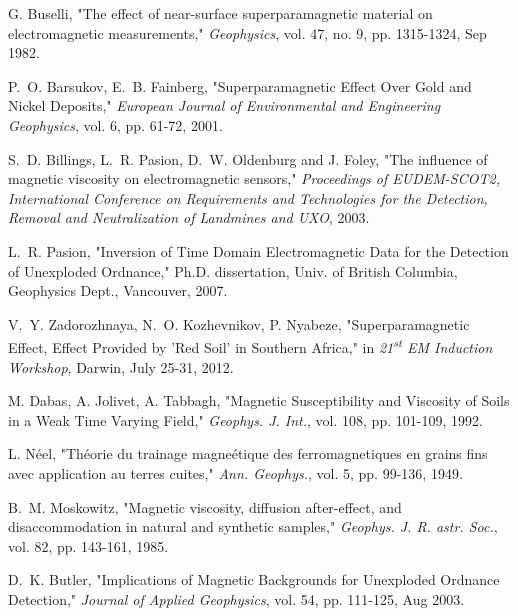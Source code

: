 \documentclass[onecolumn]{IEEEtran} %
\begin{document}
\begin{thebibliography}{100}

G. Buselli, "The effect of near-surface superparamagnetic material on electromagnetic measurements," \emph{Geophysics}, vol. 47, no. 9, pp. 1315-1324, Sep 1982.

P.~O. Barsukov, E.~B. Fainberg, "Superparamagnetic Effect Over Gold and Nickel Deposits," \emph{European Journal of Environmental and Engineering Geophysics}, vol. 6, pp. 61-72, 2001.

S.~D. Billings, L.~R. Pasion, D.~W. Oldenburg and J. Foley, "The influence of magnetic viscosity on electromagnetic sensors," \emph{Proceedings of EUDEM-SCOT2, International Conference on Requirements and Technologies for the Detection, Removal and Neutralization of Landmines and UXO}, 2003.

L.~R. Pasion, "Inversion of Time Domain Electromagnetic Data for the Detection of Unexploded Ordnance," Ph.D. dissertation, Univ. of British Columbia, Geophysics Dept., Vancouver, 2007.

V.~Y. Zadorozhnaya, N.~O. Kozhevnikov, P. Nyabeze, "Superparamagnetic Effect, Effect Provided by 'Red Soil' in Southern Africa," in \emph{21\textsuperscript{st} EM Induction Workshop}, Darwin, July 25-31, 2012.

M. Dabas, A. Jolivet, A. Tabbagh, "Magnetic Susceptibility and Viscosity of Soils in a Weak Time Varying Field," \emph{Geophys. J. Int.}, vol. 108, pp. 101-109, 1992.

L. N\'{e}el, "Th\'{e}orie du trainage magne\'{e}tique des ferromagnetiques en grains fins avec application au terres cuites," \emph{Ann. Geophys.}, vol. 5, pp. 99-136, 1949.

B.~M. Moskowitz, "Magnetic viscosity, diffusion after-effect, and disaccommodation in natural and synthetic samples," \emph{Geophys. J. R. astr. Soc.}, vol. 82, pp. 143-161, 1985.

D.~K. Butler, "Implications of Magnetic Backgrounds for Unexploded Ordnance Detection," \emph{Journal of Applied Geophysics}, vol. 54, pp. 111-125, Aug 2003.



\end{thebibliography}
\end{document}
